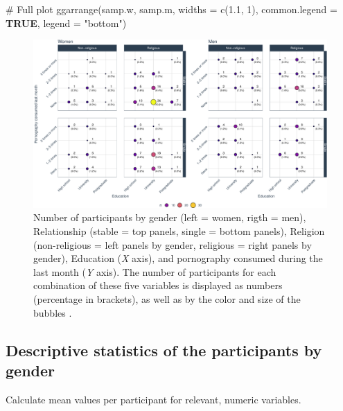 \documentclass[
  bookmarksnumbered]{article}
\newenvironment{Shaded}{\begin{snugshade}}{\end{snugshade}}
\newcommand{\AttributeTok}[1]{\textcolor[rgb]{0.80,0.80,0.80}{#1}}
\newcommand{\CommentTok}[1]{\textcolor[rgb]{0.50,0.62,0.50}{#1}}
\newcommand{\ConstantTok}[1]{\textcolor[rgb]{0.86,0.64,0.64}{\textbf{#1}}}
\newcommand{\DecValTok}[1]{\textcolor[rgb]{0.86,0.86,0.80}{#1}}
\newcommand{\FloatTok}[1]{\textcolor[rgb]{0.75,0.75,0.82}{#1}}
\newcommand{\FunctionTok}[1]{\textcolor[rgb]{0.94,0.94,0.56}{#1}}
\newcommand{\NormalTok}[1]{\textcolor[rgb]{0.80,0.80,0.80}{#1}}
\newcommand{\StringTok}[1]{\textcolor[rgb]{0.80,0.58,0.58}{#1}}
\begin{document}
\begin{Shaded}
\begin{Highlighting}[]
\CommentTok{\# Full plot}
\FunctionTok{ggarrange}\NormalTok{(samp.w, samp.m,}
          \AttributeTok{widths =} \FunctionTok{c}\NormalTok{(}\FloatTok{1.1}\NormalTok{, }\DecValTok{1}\NormalTok{), }
          \AttributeTok{common.legend =} \ConstantTok{TRUE}\NormalTok{,}
          \AttributeTok{legend =} \StringTok{"bottom"}\NormalTok{)}
\end{Highlighting}
\end{Shaded}

\begin{figure}
\centering
\includegraphics{Sexual_Desire_Arousal_files/figure-latex/sample-plot-1.pdf}
\caption{\label{fig:sample-plot}Number of participants by gender (left = women, rigth = men), Relationship (stable = top panels, single = bottom panels), Religion (non-religious = left panels by gender, religious = right panels by gender), Education (\emph{X} axis), and pornography consumed during the last month (\emph{Y} axis). The number of participants for each combination of these five variables is displayed as numbers (percentage in brackets), as well as by the color and size of the bubbles .}
\end{figure}

\hypertarget{descriptive-statistics-of-the-participants-by-gender}{%
\subsection{Descriptive statistics of the participants by gender}\label{descriptive-statistics-of-the-participants-by-gender}}

Calculate mean values per participant for relevant, numeric variables.
\end{document}
